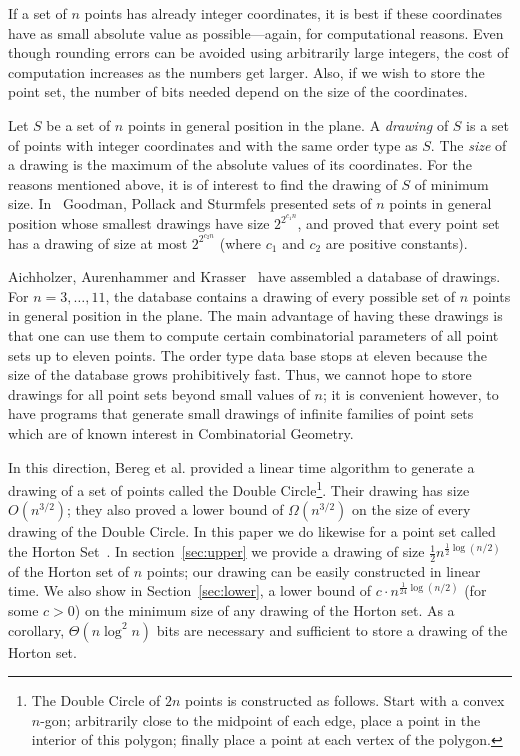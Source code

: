 \documentclass{article}
\begin{document}
If a set of $n$ points has already integer coordinates, it is best if these coordinates have as small
 absolute value as possible---again,
for computational reasons. Even though rounding errors can be avoided using arbitrarily large
integers, the cost of computation
increases as the numbers get larger. Also, if we wish
to store the point set, the number of bits needed depend on the
size of the coordinates.

Let $S$ be a set of $n$ points in general position in the plane.
A \emph{drawing} of $S$ is a set of points with integer
coordinates and with the same order type as $S$. The
\emph{size} of a drawing is the maximum of
the absolute values of its coordinates. For the reasons mentioned above,
 it is of interest to find the drawing of $S$ of minimum size.
In~\cite{goodman}  Goodman, Pollack and Sturmfels
presented sets of $n$ points in general position whose
smallest drawings have size $2^{2^{c_1 n}}$, and proved  that every point
set has a drawing of size at most $2^{2^{c_2 n}}$ (where
$c_1$ and $c_2$ are positive constants). 

Aichholzer, Aurenhammer and Krasser~\cite{database} have assembled a database of drawings.
For $n=3, \dots, 11$, the database contains a drawing of every possible set
of $n$ points in general position in the plane.
The main advantage of having these drawings is that one can use them
to compute certain combinatorial parameters of all point sets up to eleven points. 
The order type data base stops at eleven because the size of the database
grows prohibitively fast. Thus, we cannot hope to store drawings for all point sets
beyond small values of $n$; it is convenient however, to have programs that generate
small drawings of infinite families of point sets which
are of known interest in Combinatorial Geometry. 

In this direction, Bereg et al. \cite{double_circle} provided a linear time algorithm to generate
a drawing of a set of points called the Double Circle\footnote{The Double
 Circle of $2n$ points is constructed as follows. Start with
a convex $n$-gon; arbitrarily close to the midpoint 
of each edge, place a point in the interior of this polygon;
finally place a point at each vertex of the polygon.}.
Their drawing has size $O(n^{3/2})$; they also proved a lower bound of $\Omega(n^{3/2})$ on the size of every drawing
of the Double Circle.  In this paper we do likewise for a point set called the Horton Set~\cite{hortonsets}.
In section~\ref{sec:upper} we provide a drawing of size $\frac{1}{2} n^{\frac{1}{2} \log (n/2)}$ of the Horton set of $n$ points;
our drawing can be easily constructed in linear time. We also show in Section~\ref{sec:lower},  
a lower bound of $c \cdot n^{\frac{1}{24}\log (n/2)}$ (for some $c>0$) on the minimum size 
of any drawing of the Horton set. As a corollary, $\Theta(n\log^2 n)$ bits
are necessary and sufficient to store a drawing of the Horton set. 
\end{document}
